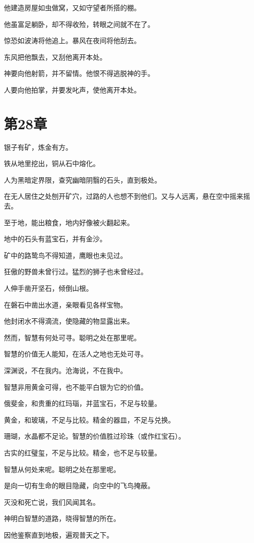 \documentclass[12pt,oneside]{book}
\begin{document}
他建造房屋如虫做窝，又如守望者所搭的棚。

他虽富足躺卧，却不得收殓，转眼之间就不在了。

惊恐如波涛将他追上。暴风在夜间将他刮去。

东风把他飘去，又刮他离开本处。

神要向他射箭，并不留情。他恨不得逃脱神的手。

人要向他拍掌，并要发叱声，使他离开本处。


\chapter{第28章}
银子有矿，炼金有方。

铁从地里挖出，铜从石中熔化。

人为黑暗定界限，查究幽暗阴翳的石头，直到极处。

在无人居住之处刨开矿穴，过路的人也想不到他们。又与人远离，悬在空中摇来摇去。

至于地，能出粮食，地内好像被火翻起来。

地中的石头有蓝宝石，并有金沙。

矿中的路鸷鸟不得知道，鹰眼也未见过。

狂傲的野兽未曾行过。猛烈的狮子也未曾经过。

人伸手凿开坚石，倾倒山根。

在磐石中凿出水道，亲眼看见各样宝物。

他封闭水不得滴流，使隐藏的物显露出来。

然而，智慧有何处可寻。聪明之处在那里呢。

智慧的价值无人能知，在活人之地也无处可寻。

深渊说，不在我内。沧海说，不在我中。

智慧非用黄金可得，也不能平白银为它的价值。

俄斐金，和贵重的红玛瑙，并蓝宝石，不足与较量。

黄金，和玻璃，不足与比较。精金的器皿，不足与兑换。

珊瑚，水晶都不足论。智慧的价值胜过珍珠（或作红宝石）。

古实的红璧玺，不足与比较。精金，也不足与较量。

智慧从何处来呢。聪明之处在那里呢。

是向一切有生命的眼目隐藏，向空中的飞鸟掩蔽。

灭没和死亡说，我们风闻其名。

神明白智慧的道路，晓得智慧的所在。

因他鉴察直到地极，遍观普天之下。
\end{document}
